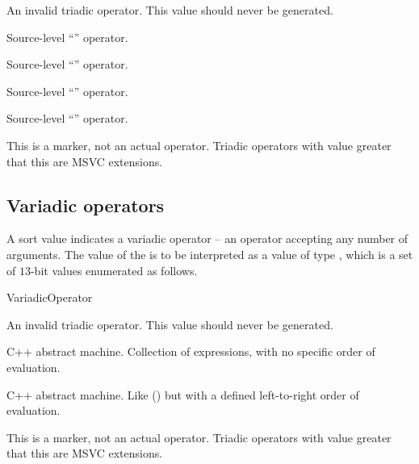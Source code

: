 An invalid triadic operator.  This value should never be generated.

Source-level ``'' operator.

Source-level ``'' operator.

Source-level ``'' operator.

Source-level ``'' operator.

This is a marker, not an actual operator. Triadic operators with 
value greater that this are MSVC extensions.

\subsection{Variadic operators}
\label{sec:ifc:OperatorSort:Variadic}

A sort value  indicates a variadic operator -- 
an operator accepting any number of arguments.  The
value of the  is to be interpreted as a value of type 
, which is a set of $13$-bit values enumerated as follows.
%
\begin{Enumeration}{VariadicOperator}

	\setcounter{enumi}{1023}
\end{Enumeration}


An invalid triadic operator.  This value should never be generated.


C++ abstract machine.  Collection of expressions, with no specific order of evaluation. 


C++ abstract machine.  Like  
() but with a defined left-to-right 
order of evaluation.

This is a marker, not an actual operator. Triadic operators with 
value greater that this are MSVC extensions.

